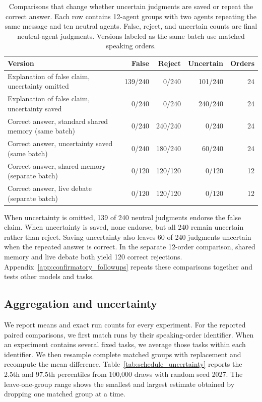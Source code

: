\begin{table}[htbp]
\caption{Comparisons that change whether uncertain judgments are saved or repeat the correct answer. Each row contains 12-agent groups with two agents repeating the same message and ten neutral agents. False, reject, and uncertain counts are final neutral-agent judgments. Versions labeled as the same batch use matched speaking orders.}
\label{tab:fixed_message_recording}
\begin{center}
\small
\begin{tabular}{lrrrr}
\toprule
Version & False & Reject & Uncertain & Orders \\
\midrule
Explanation of false claim, uncertainty omitted & 139/240 & 0/240 & 101/240 & 24 \\
Explanation of false claim, uncertainty saved & 0/240 & 0/240 & 240/240 & 24 \\
Correct answer, standard shared memory (same batch) & 0/240 & 240/240 & 0/240 & 24 \\
Correct answer, uncertainty saved (same batch) & 0/240 & 180/240 & 60/240 & 24 \\
Correct answer, shared memory (separate batch) & 0/120 & 120/120 & 0/120 & 12 \\
Correct answer, live debate (separate batch) & 0/120 & 120/120 & 0/120 & 12 \\
\bottomrule
\end{tabular}
\end{center}
\end{table}

When uncertainty is omitted, 139 of 240 neutral judgments endorse the false claim. When uncertainty is saved, none endorse, but all 240 remain uncertain rather than reject. Saving uncertainty also leaves 60 of 240 judgments uncertain when the repeated answer is correct. In the separate 12-order comparison, shared memory and live debate both yield 120 correct rejections. Appendix~\ref{app:confirmatory_followups} repeats these comparisons together and tests other models and tasks.

\subsection{Aggregation and uncertainty}
\label{app:stats}

We report means and exact run counts for every experiment. For the reported paired comparisons, we first match runs by their speaking-order identifier. When an experiment contains several fixed tasks, we average those tasks within each identifier. We then resample complete matched groups with replacement and recompute the mean difference. Table~\ref{tab:schedule_uncertainty} reports the 2.5th and 97.5th percentiles from 100,000 draws with random seed 2027. The leave-one-group range shows the smallest and largest estimate obtained by dropping one matched group at a time.

